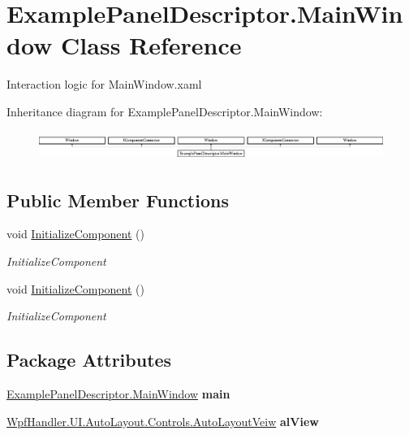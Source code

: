 \hypertarget{class_example_panel_descriptor_1_1_main_window}{}\section{Example\+Panel\+Descriptor.\+Main\+Window Class Reference}
\label{class_example_panel_descriptor_1_1_main_window}


Interaction logic for Main\+Window.\+xaml  


Inheritance diagram for Example\+Panel\+Descriptor.\+Main\+Window\+:\begin{figure}[H]
\begin{center}
\leavevmode
\includegraphics[height=0.957265cm]{db/daa/class_example_panel_descriptor_1_1_main_window}
\end{center}
\end{figure}
\subsection*{Public Member Functions}
\begin{DoxyCompactItemize}
\item 
void \mbox{\hyperlink{class_example_panel_descriptor_1_1_main_window_a486d5cc272c90e4e52443006ed4a98ce}{Initialize\+Component}} ()
\begin{DoxyCompactList}\small\item\em Initialize\+Component \end{DoxyCompactList}\item 
void \mbox{\hyperlink{class_example_panel_descriptor_1_1_main_window_a486d5cc272c90e4e52443006ed4a98ce}{Initialize\+Component}} ()
\begin{DoxyCompactList}\small\item\em Initialize\+Component \end{DoxyCompactList}\end{DoxyCompactItemize}
\subsection*{Package Attributes}
\begin{DoxyCompactItemize}
\item 
\mbox{\label{class_example_panel_descriptor_1_1_main_window_a785c46b50529ebdd55a99a839d775ac6}} 
\mbox{\hyperlink{class_example_panel_descriptor_1_1_main_window}{Example\+Panel\+Descriptor.\+Main\+Window}} {\bfseries main}
\item 
\mbox{\label{class_example_panel_descriptor_1_1_main_window_a2b63c46e204ead9698423b95bc235b48}} 
\mbox{\hyperlink{class_wpf_handler_1_1_u_i_1_1_auto_layout_1_1_controls_1_1_auto_layout_veiw}{Wpf\+Handler.\+U\+I.\+Auto\+Layout.\+Controls.\+Auto\+Layout\+Veiw}} {\bfseries al\+View}
\end{DoxyCompactItemize}
